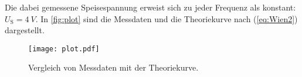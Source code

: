 Die dabei gemessene Speisespannung erweist sich zu jeder Frequenz als konstant: $U_\text{S} = \qty{4}{V}$.
In \autoref{fig:plot} sind die Messdaten und die Theoriekurve nach (\ref{eq:Wien2}) dargestellt.
\begin{figure}[H]
  \centering
  \texttt{[image: plot.pdf]}
  \caption{Vergleich von Messdaten mit der Theoriekurve.}
  \label{fig:plot}
\end{figure}
